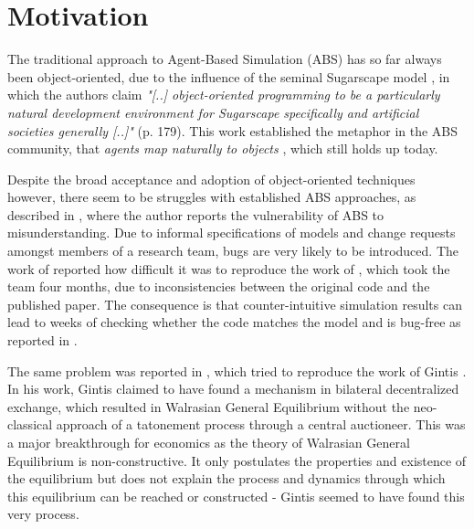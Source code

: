 \chapter{Motivation}
\label{ch:motivation}
The traditional approach to Agent-Based Simulation (ABS) has so far always been object-oriented, due to the influence of the seminal Sugarscape model \cite{epstein_growing_1996}, in which the authors claim \textit{"[..] object-oriented programming to be a particularly natural development environment for Sugarscape specifically and artificial societies generally [..]"} (p. 179). This work established the metaphor in the ABS community, that \textit{agents map naturally to objects} \cite{north_managing_2007}, which still holds up today.

Despite the broad acceptance and adoption of object-oriented techniques however, there seem to be struggles with established ABS approaches, as described in \cite{axelrod_chapter_2006}, where the author reports the vulnerability of ABS to misunderstanding. Due to informal specifications of models and change requests amongst members of a research team, bugs are very likely to be introduced. The work of \cite{axtell_aligning_1996} reported how difficult it was to reproduce the work of \cite{axelrod_convergence_1995}, which took the team four months, due to inconsistencies between the original code and the published paper. The consequence is that counter-intuitive simulation results can lead to weeks of checking whether the code matches the model and is bug-free as reported in \cite{axelrod_advancing_1997}.

The same problem was reported in \cite{botta2013mathematical}, which tried to reproduce the work of Gintis \cite{gintis_emergence_2006}. In his work, Gintis claimed to have found a mechanism in bilateral decentralized exchange, which resulted in Walrasian General Equilibrium without the neo-classical approach of a tatonement process through a central auctioneer. This was a major breakthrough for economics as the theory of Walrasian General Equilibrium is non-constructive. It only postulates the properties and existence of the equilibrium \cite{colell_microeconomic_1995} but does not explain the process and dynamics through which this equilibrium can be reached or constructed - Gintis seemed to have found this very process.

